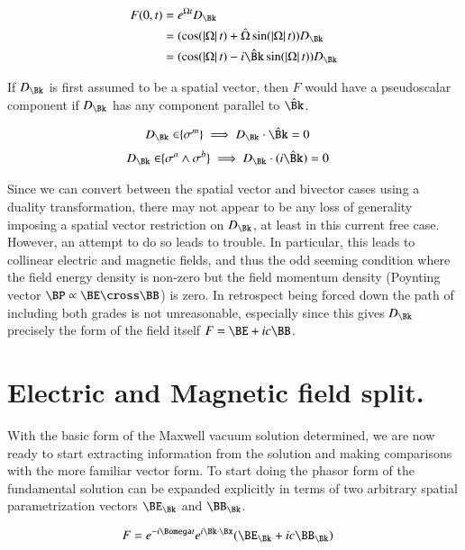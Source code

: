 \begin{align*}
F(0, t)
&= e^{\Omega t} D_\Bk \\
&= (\cos(\Abs{\Omega} t) + \hat{\Omega} \sin(\Abs{\Omega} t)) D_\Bk \\
&= (\cos(\Abs{\Omega} t) - i \hat{\Bk} \sin(\Abs{\Omega} t)) D_\Bk \\
\end{align*}

If $D_\Bk$ is first assumed to be a spatial vector, then $F$ would have a pseudoscalar component if $D_\Bk$ has any component parallel to $\hat{\Bk}$.

\begin{align}\label{eqn:maxwellVacuum:commutationRequirementVector}
D_\Bk \in \span\{\sigma^m\} \implies D_\Bk \cdot \hat{\Bk} = 0
\end{align}
\begin{align}\label{eqn:maxwellVacuum:commutationRequirementBiVector}
D_\Bk \in \span\{\sigma^a \wedge \sigma^b\} \implies D_\Bk \cdot (i\hat{\Bk}) = 0
\end{align}

Since we can convert between the spatial vector and bivector cases using a duality transformation, there may not appear to be any loss of generality imposing a spatial vector restriction on $D_\Bk$, at least in this current free case.  However, an attempt to do so leads to trouble.  In particular, this leads to collinear electric and magnetic fields, and thus the odd seeming condition where the field energy density is non-zero but the field momentum density (Poynting vector $\BP \propto \BE \cross \BB$) is zero.  In retrospect being forced down the path of including both grades is not unreasonable, especially since this gives $D_\Bk$ precisely the form of the field itself $F = \BE + i c \BB$.

\section{Electric and Magnetic field split.}

With the basic form of the Maxwell vacuum solution determined, we are now ready to start extracting information from the solution and making comparisons with the more familiar vector form.  To start doing the phasor form of the fundamental solution can be expanded explicitly in terms of two arbitrary spatial parametrization vectors $\BE_\Bk$ and $\BB_\Bk$.

\begin{align}\label{eqn:maxwellVacuum:phasor}
F &= e^{-i\Bomega t} e^{i \Bk \cdot \Bx} (\BE_\Bk + i c \BB_\Bk)
\end{align}

